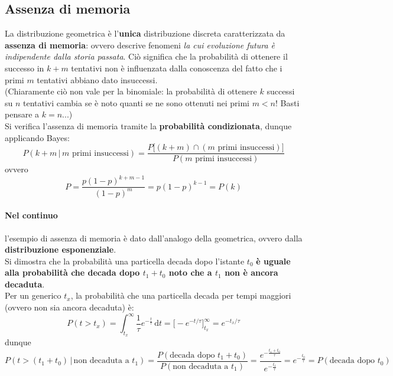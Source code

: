 \documentclass[10pt, oneside]{book}
\newcommand{\integral}[4]{\int_{#1}^{#2} #3 \, \mathrm{d}#4}
\begin{document}
\subsection{Assenza di memoria}
La distribuzione geometrica è l'\textbf{unica} distribuzione discreta caratterizzata da \textbf{assenza di memoria}: ovvero descrive fenomeni \textit{la cui evoluzione futura è indipendente dalla storia passata}. Ciò significa che la probabilità di ottenere il successo in $k+m$ tentativi non è influenzata dalla conoscenza del fatto che i primi $m$ tentativi abbiano dato insuccessi.\\
(Chiaramente ciò non vale per la binomiale: la probabilità di ottenere $k$ successi su $n$ tentativi cambia se è noto quanti se ne sono ottenuti nei primi $m < n$! Basti pensare a $k=n$...)\\Si verifica l'assenza di memoria tramite la \textbf{probabilità condizionata}, dunque applicando Bayes:
\[P(k+m \, \big| \, m \textrm{ primi insuccessi}) = \frac{P \big[(k+m) \cap (m \textrm{ primi insuccessi})\big]}{P(m \textrm{ primi insuccessi})}\]
ovvero
\[P = \frac{p (1-p)^{k+m-1}}{(1-p)^m} = p (1-p)^{k-1} = P(k)\]

\paragraph{Nel continuo} l'esempio di assenza di memoria è dato dall'analogo della geometrica, ovvero dalla \textbf{distribuzione esponenziale}.\\
Si dimostra che la probabilità una particella decada dopo l'istante $t_0$ \textbf{è uguale alla probabilità che decada dopo $t_1 + t_0$ noto che a $t_1$ non è ancora decaduta}.\\
Per un generico $t_x$, la probabilità che una particella decada per tempi maggiori (ovvero non sia ancora decaduta) è:
\[P(t > t_x) = \integral{t_x}{\infty}{\frac{1}{\tau} e^{\displaystyle - \frac{t}{\tau}}}{t} = \big[ - e^{\displaystyle - t/\tau} \big]_{t_x}^{\infty} = e^{\displaystyle - t_x/\tau}\]
dunque
\[P(t > (t_1 + t_0) \, \big| \, \textrm{non decaduta a } t_1) = \frac{P(\textrm{decada dopo } t_1+t_0)}{P(\textrm{non decaduta a } t_1)} = \frac{e^{\displaystyle - \frac{t_1 + t_0}{\tau}}}{e^{\displaystyle - \frac{t_1}{\tau}}} = e^{\displaystyle - \frac{t_0}{\tau}} = P (\textrm{decada dopo } t_0)\]
\end{document}
